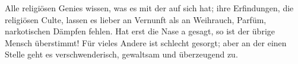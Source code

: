 Alle religiösen Genies wissen, was es mit der  auf sich hat; ihre Erfindungen, die religiösen Culte, lassen es lieber an Vernunft als an Weihrauch, Parfüm, narkotischen Dämpfen fehlen. Hat erst die Nase a gesagt, so ist der übrige Mensch überstimmt! Für vieles Andere ist schlecht gesorgt; aber an der einen Stelle geht es verschwenderisch, gewaltsam und überzeugend zu.
\par

